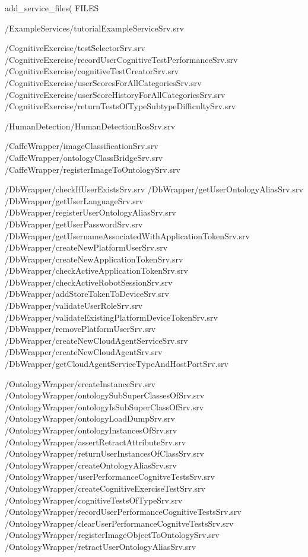 add\-\_\-service\-\_\-files( F\-I\-L\-E\-S

/\-Example\-Services/tutorial\-Example\-Service\-Srv.srv

/\-Cognitive\-Exercise/test\-Selector\-Srv.srv /\-Cognitive\-Exercise/record\-User\-Cognitive\-Test\-Performance\-Srv.srv /\-Cognitive\-Exercise/cognitive\-Test\-Creator\-Srv.srv /\-Cognitive\-Exercise/user\-Scores\-For\-All\-Categories\-Srv.srv /\-Cognitive\-Exercise/user\-Score\-History\-For\-All\-Categories\-Srv.srv /\-Cognitive\-Exercise/return\-Tests\-Of\-Type\-Subtype\-Difficulty\-Srv.srv

/\-Human\-Detection/\-Human\-Detection\-Ros\-Srv.srv

/\-Caffe\-Wrapper/image\-Classification\-Srv.srv /\-Caffe\-Wrapper/ontology\-Class\-Bridge\-Srv.srv /\-Caffe\-Wrapper/register\-Image\-To\-Ontology\-Srv.srv

/\-Db\-Wrapper/check\-If\-User\-Exists\-Srv.srv /\-Db\-Wrapper/get\-User\-Ontology\-Alias\-Srv.srv /\-Db\-Wrapper/get\-User\-Language\-Srv.srv /\-Db\-Wrapper/register\-User\-Ontology\-Alias\-Srv.srv /\-Db\-Wrapper/get\-User\-Password\-Srv.srv /\-Db\-Wrapper/get\-Username\-Associated\-With\-Application\-Token\-Srv.srv /\-Db\-Wrapper/create\-New\-Platform\-User\-Srv.srv /\-Db\-Wrapper/create\-New\-Application\-Token\-Srv.srv /\-Db\-Wrapper/check\-Active\-Application\-Token\-Srv.srv /\-Db\-Wrapper/check\-Active\-Robot\-Session\-Srv.srv /\-Db\-Wrapper/add\-Store\-Token\-To\-Device\-Srv.srv /\-Db\-Wrapper/validate\-User\-Role\-Srv.srv /\-Db\-Wrapper/validate\-Existing\-Platform\-Device\-Token\-Srv.srv /\-Db\-Wrapper/remove\-Platform\-User\-Srv.srv /\-Db\-Wrapper/create\-New\-Cloud\-Agent\-Service\-Srv.srv /\-Db\-Wrapper/create\-New\-Cloud\-Agent\-Srv.srv /\-Db\-Wrapper/get\-Cloud\-Agent\-Service\-Type\-And\-Host\-Port\-Srv.srv

/\-Ontology\-Wrapper/create\-Instance\-Srv.srv /\-Ontology\-Wrapper/ontology\-Sub\-Super\-Classes\-Of\-Srv.srv /\-Ontology\-Wrapper/ontology\-Is\-Sub\-Super\-Class\-Of\-Srv.srv /\-Ontology\-Wrapper/ontology\-Load\-Dump\-Srv.srv /\-Ontology\-Wrapper/ontology\-Instances\-Of\-Srv.srv /\-Ontology\-Wrapper/assert\-Retract\-Attribute\-Srv.srv /\-Ontology\-Wrapper/return\-User\-Instances\-Of\-Class\-Srv.srv /\-Ontology\-Wrapper/create\-Ontology\-Alias\-Srv.srv /\-Ontology\-Wrapper/user\-Performance\-Cognitve\-Tests\-Srv.srv /\-Ontology\-Wrapper/create\-Cognitive\-Exercise\-Test\-Srv.srv /\-Ontology\-Wrapper/cognitive\-Tests\-Of\-Type\-Srv.srv /\-Ontology\-Wrapper/record\-User\-Performance\-Cognitive\-Tests\-Srv.srv /\-Ontology\-Wrapper/clear\-User\-Performance\-Cognitve\-Tests\-Srv.srv /\-Ontology\-Wrapper/register\-Image\-Object\-To\-Ontology\-Srv.srv /\-Ontology\-Wrapper/retract\-User\-Ontology\-Alias\-Srv.srv


